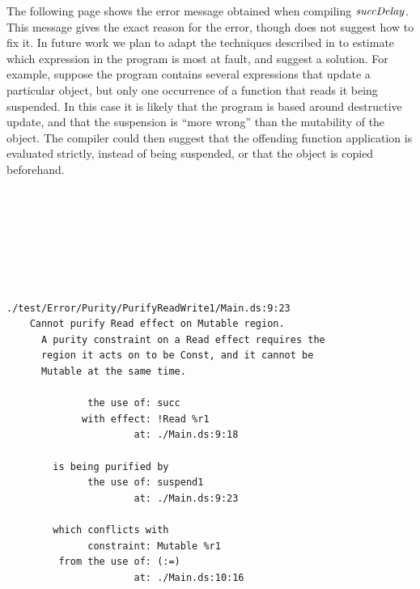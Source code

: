 The following page shows the error message obtained when compiling $\operatorname{\mathit{succDelay}}$. This message gives the exact reason for the error, though does not suggest how to fix it. In future work we plan to adapt the techniques described in \cite{heeren:improving-type-error-messages} to estimate which expression in the program is most at fault, and suggest a solution. For example, suppose the program contains several expressions that update a particular object, but only one occurrence of a function that reads it being suspended. In this case it is likely that the program is based around destructive update, and that the suspension is ``more wrong'' than the mutability of the object. The compiler could then suggest that the offending function application is evaluated strictly, instead of being suspended, or that the object is copied beforehand.


\begin{small}
\begin{lstlisting}







./test/Error/Purity/PurifyReadWrite1/Main.ds:9:23
    Cannot purify Read effect on Mutable region.
      A purity constraint on a Read effect requires the
      region it acts on to be Const, and it cannot be
      Mutable at the same time.

              the use of: succ
             with effect: !Read %r1
                      at: ./Main.ds:9:18

        is being purified by
              the use of: suspend1
                      at: ./Main.ds:9:23

        which conflicts with
              constraint: Mutable %r1
         from the use of: (:=)
                      at: ./Main.ds:10:16

\end{lstlisting}
\end{small}

